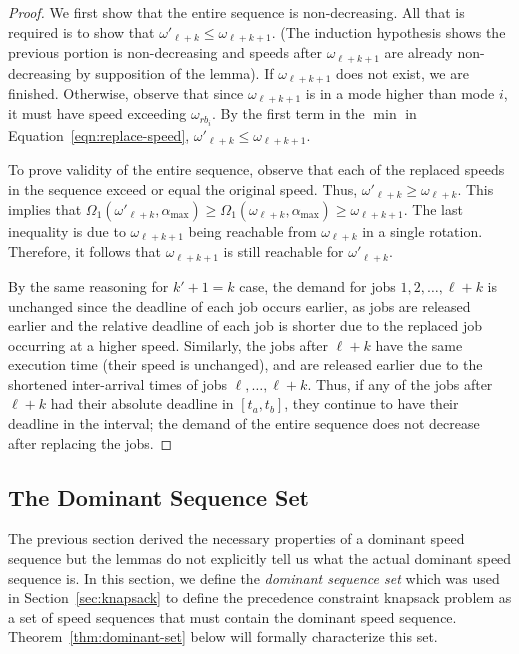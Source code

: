 \begin{proof}
We first show that the entire sequence is non-decreasing.  All that is required is to show that $\omega'_{\ell + k} \leq \omega_{\ell + k+1}$.  (The induction hypothesis shows the previous portion is non-decreasing and speeds after $\omega_{\ell + k+1}$ are already non-decreasing by supposition of the lemma). If $\omega_{\ell + k+1}$ does not exist, we are finished.  Otherwise, observe that since $\omega_{\ell + k+1}$ is in a mode higher than mode $i$, it must have speed exceeding $\omega_{rb_i}$.  By the first term in the $\min$ in Equation~\ref{eqn:replace-speed}, $\omega'_{\ell + k} \leq \omega_{\ell + k+1}$.

To prove validity of the entire sequence, observe that each of the replaced speeds in the sequence exceed or equal the original speed.  Thus, $\omega'_{\ell + k} \geq \omega_{\ell + k}$.  This implies that $\Omega_1(\omega'_{\ell + k}, \alpha_{\max}) \geq \Omega_1(\omega_{\ell + k}, \alpha_{\max}) \geq \omega_{\ell+ k+1}$.  The last inequality is due to $\omega_{\ell + k+1}$ being reachable from $\omega_{\ell + k}$ in a single rotation.  Therefore, it follows that $\omega_{\ell + k+1}$ is still reachable for $\omega'_{\ell +k}$.

By the same reasoning for $k'+1=k$ case, the demand for jobs $1,2,\ldots, \ell+k$ is unchanged since the deadline of each job occurs earlier, as jobs are released earlier and the relative deadline of each job is shorter due to the replaced job occurring at a higher speed.  Similarly, the jobs after $\ell+k$ have the same execution time (their speed is unchanged), and are released earlier due to the shortened inter-arrival times of jobs $\ell, \ldots, \ell+k$.  Thus, if any of the jobs after $\ell +k$ had their absolute deadline in $[t_a, t_b]$, they continue to have their deadline in the interval; the demand of the entire sequence does not decrease after replacing the jobs.
\end{proof}

\subsection{The Dominant Sequence Set}\label{sec:Summary}
The previous section derived the necessary properties of a dominant speed sequence but the lemmas do not explicitly tell us what the actual dominant speed sequence is.  In this section, we define the \emph{dominant sequence set} which was used in Section~\ref{sec:knapsack} to define the precedence constraint knapsack problem as a set of speed sequences that must contain the dominant speed sequence.  Theorem~\ref{thm:dominant-set} below will formally characterize this set.

